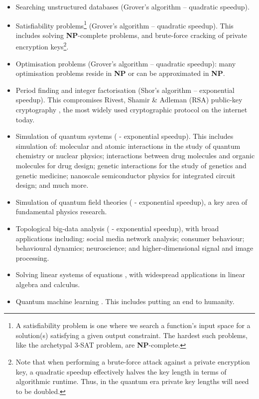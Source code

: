 \documentclass[aps,rmp,twocolumn,amsmath,amssymb,nofootinbib,superscriptaddress,longbibliography,floatfix,table-of-contents,eqsecnum]{revtex4-1}
\begin{document}
\begin{itemize}
	\item Searching unstructured databases (Grover's algorithm \cite{bib:Grover96} -- quadratic speedup).
	\item Satisfiability problems\footnote{A satisfiability problem is one where we search a function's input space for a solution(s) satisfying a given output constraint. The hardest such problems, like the archetypal \textsc{3-SAT} problem, are \textbf{NP}-complete.} (Grover's algorithm -- quadratic speedup). This includes solving \textbf{NP}-complete problems, and brute-force cracking of private encryption keys\footnote{Note that when performing a brute-force attack against a private encryption key, a quadratic speedup effectively halves the key length in terms of algorithmic runtime. Thus, in the quantum era private key lengths will need to be doubled.}.
	\item Optimisation problems (Grover's algorithm -- quadratic speedup): many optimisation problems reside in \textbf{NP} or can be approximated in \textbf{NP}.
	\item Period finding and integer factorisation (Shor's algorithm \cite{bib:ShorFactor} -- exponential speedup). This compromises Rivest, Shamir \& Adleman (RSA) public-key cryptography \cite{bib:RSA}, the most widely used cryptographic protocol on the internet today.
	\item Simulation of quantum systems (\cite{bib:lloyd1996universal} - exponential speedup). This includes simulation of: molecular and atomic interactions in the study of quantum chemistry or nuclear physics; interactions between drug molecules and organic molecules for drug design; genetic interactions for the study of genetics and genetic medicine; nanoscale semiconductor physics for integrated circuit design; and much more.
	\item Simulation of quantum field theories (\cite{bib:JLP, bib:RohdeWavelet15} - exponential speedup), a key area of fundamental physics research.
	\item Topological big-data analysis (\cite{bib:lloyd2016quantum, USTCexperiment} - exponential speedup), with broad applications including: social media network analysis; consumer behaviour; behavioural dynamics; neuroscience; and higher-dimensional signal and image processing.
	\item Solving linear systems of equations \cite{bib:harrow2009quantum, bib:BerryLinear}, with widespread applications in linear algebra and calculus.
	\item Quantum machine learning \cite{bib:lloyd2013quantum}. This includes putting an end to humanity.
\end{itemize}
\end{document}
